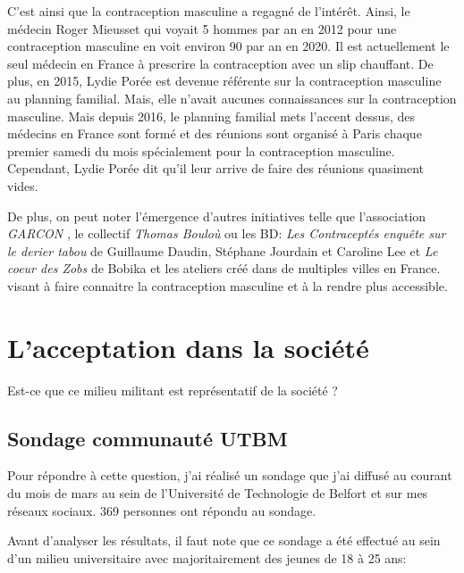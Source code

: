 \documentclass[12pt,a4paper]{report}
\begin{document}
C'est ainsi que la contraception masculine a regagné de l'intérêt. Ainsi, le médecin Roger Mieusset qui voyait 5 hommes par an en 2012 pour une contraception masculine en voit environ 90 par an en 2020.\cite{guillaumedaudinContraceptesEnqueteDernier2022}
Il est actuellement le seul médecin en France à prescrire la contraception avec un slip chauffant.\cite{bobikaCoeurZobs2022}
De plus, en 2015, Lydie Porée est devenue référente sur la contraception masculine au planning familial.
Mais, elle n'avait aucunes connaissances sur la contraception masculine.
Mais depuis 2016, le planning familial mets l'accent dessus, des médecins en France sont formé et des réunions sont organisé à Paris chaque premier samedi du mois spécialement pour la contraception masculine.
Cependant, Lydie Porée dit qu'il leur arrive de faire des réunions quasiment vides. \cite{guillaumedaudinContraceptesEnqueteDernier2022}

De plus, on peut noter l'émergence d'autres initiatives telle que l'association \textit{GARCON} \cite{QuiSommesNous}, le collectif \textit{Thomas Bouloù} \cite{ThomasBoulouInterview} ou les BD: \textit{Les Contraceptés enquête sur le derier tabou} de Guillaume Daudin, Stéphane Jourdain et Caroline Lee \cite{guillaumedaudinContraceptesEnqueteDernier2022} et \textit{Le coeur des Zobs} de Bobika \cite{bobikaCoeurZobs2022} et les ateliers créé dans de multiples villes en France. \cite{ContraceptionMasculineComment2023}\cite{OuNousTrouver}\cite{guillaumedaudinContraceptesEnqueteDernier2022} visant à faire connaitre la contraception masculine et à la rendre plus accessible.

\section{L'acceptation dans la société}

Est-ce que ce milieu militant est représentatif de la société ?

\subsection{Sondage communauté UTBM}
Pour répondre à cette question, j'ai réalisé un sondage que j'ai diffusé au courant du mois de mars au sein de l'Université de Technologie de Belfort et sur mes réseaux sociaux. 369 personnes ont répondu au sondage.

Avant d'analyser les résultats, il faut note que ce sondage a été effectué au sein d'un milieu universitaire avec majoritairement des jeunes de 18 à 25 ans:
\end{document}
